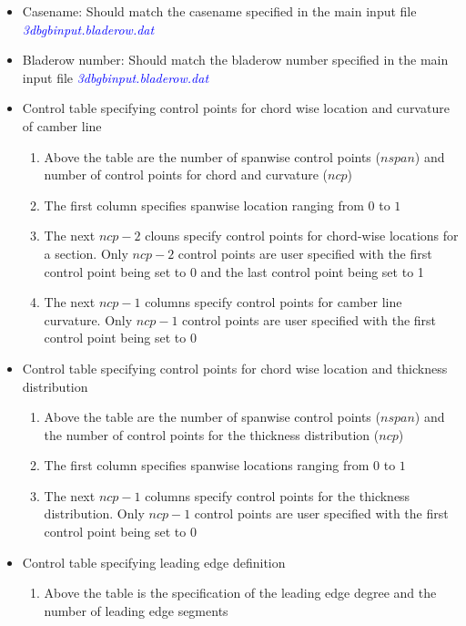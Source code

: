 \documentclass[8pt]{article}
\begin{document}
\noindent
\begin{itemize}[leftmargin=*]
    \item Casename: Should match the casename specified in the main input file \textit{\textcolor{blue}{3dbgbinput.bladerow.dat}}
    \item Bladerow number: Should match the bladerow number specified in the main input file \textit{\textcolor{blue}{3dbgbinput.bladerow.dat}}
    \item Control table specifying control points for chord wise location and curvature of camber line
    \begin{enumerate}[label=\alph*]
        \item Above the table are the number of spanwise control points ($nspan$) and number of control points for chord and curvature ($ncp$)
        \item The first column specifies spanwise location ranging from $0$ to $1$
        \item The next $ncp - 2$ clouns specify control points for chord-wise locations for a section. Only $ncp - 2$ control points are user specified with the first control point being set to 0 and the last control point being set to 1
        \item The next $ncp - 1$ columns specify control points for camber line curvature. Only $ncp - 1$ control points are user specified with the first control point being set to 0 
    \end{enumerate}
    \item Control table specifying control points for chord wise location and thickness distribution
    \begin{enumerate}[label=\alph*]
        \item Above the table are the number of spanwise control points ($nspan$) and the number of control points for the thickness distribution ($ncp$)
        \item The first column specifies spanwise locations ranging from $0$ to $1$
        \item The next $ncp - 1$ columns specify control points for the thickness distribution. Only $ncp - 1$ control points are user specified with the first control point being set to 0
    \end{enumerate}
    \item Control table specifying leading edge definition
    \begin{enumerate}[label=\alph*]
        \item Above the table is the specification of the leading edge degree and the number of leading edge segments

\end{enumerate}
\end{itemize}
\end{document}
